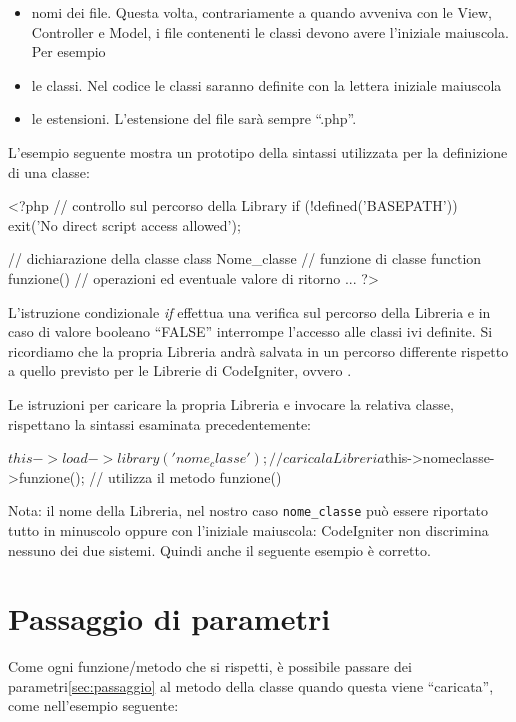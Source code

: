 \begin{itemize}
\item nomi dei file. Questa volta, contrariamente a quando avveniva con le View, Controller e Model, i file contenenti le classi devono avere l'iniziale maiuscola. Per esempio 
\item le classi. Nel codice le classi saranno definite con la lettera iniziale maiuscola
\item le estensioni. L'estensione del file sarà sempre ``.php''.
\end{itemize}

L'esempio seguente mostra un prototipo della sintassi utilizzata per la definizione di una classe:

\begin{code}
<?php 
// controllo sul percorso della Library
if (!defined('BASEPATH')) exit('No direct script access allowed');  

// dichiarazione della classe
class Nome_classe {
  // funzione di classe
  function funzione() {
    // operazioni ed eventuale valore di ritorno
    ...
	}
}
?>
\end{code}

L'istruzione condizionale \emph{if} effettua una verifica sul percorso della Libreria e in caso di valore booleano ``FALSE'' interrompe l'accesso alle classi ivi definite. Si ricordiamo che la propria Libreria andrà salvata in un percorso differente rispetto a quello previsto per le Librerie di CodeIgniter, ovvero .

Le istruzioni per caricare la propria Libreria e invocare la relativa classe, rispettano la sintassi esaminata precedentemente:

\begin{code}
$this->load->library('nome_classe'); // carica la Libreria
$this->nomeclasse->funzione(); // utilizza il metodo funzione()
\end{code}

Nota: il nome della Libreria, nel nostro caso \verb|nome_classe| può essere riportato tutto in minuscolo oppure con l'iniziale maiuscola: CodeIgniter non discrimina nessuno dei due sistemi. Quindi anche il seguente esempio è corretto.


\section*{Passaggio di parametri}
Come ogni funzione/metodo che si rispetti, è possibile passare dei parametri\vref{sec:passaggio} al metodo della classe quando questa viene ``caricata'', come nell'esempio seguente:

